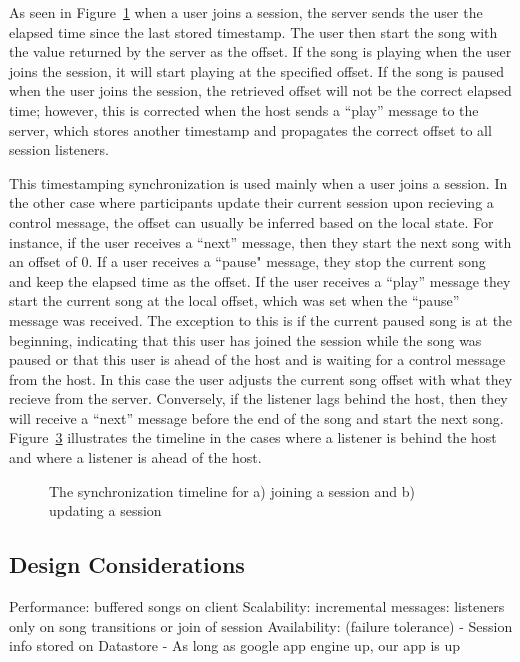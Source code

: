 As seen in Figure~\ref{fig:syncJoin} when a user joins a session, 
the server sends the user the elapsed time since the last stored timestamp. 
The user then start the song with the value returned by the server as 
the offset. If the song is playing when the user joins the session, 
it will start playing at the specified offset. If the song is paused when 
the user joins the session, the retrieved offset will not be the correct 
elapsed time; however, this is corrected when the host sends a ``play'' 
message to the server, which stores another timestamp and propagates
the correct offset to all session listeners.

This timestamping synchronization is used mainly when a user joins a session.
In the other case where participants update their current session upon 
recieving a control message, the offset can usually be inferred based on the local state. 
For instance, if the user receives a ``next'' message, then they
start the next song with an offset of 0. If a user receives a ``pause" 
message, they stop the current song and keep the elapsed time as the offset.
If the user receives a ``play'' message they start the current song at the 
local offset, which was set when the ``pause'' message was received. The exception to this 
is if the current paused song is at the beginning, indicating
that this user has joined the session while the song was paused or that this user is
ahead of the host and is waiting for a control message from the host. 
In this case the user adjusts the current song offset with what 
they recieve from the server. Conversely, if the listener lags behind the host, then they will
receive a ``next'' message before the end of the song and start the next song. Figure~\ref{fig:syncUsers}
illustrates the timeline in the cases where a listener is behind the host and where a listener
is ahead of the host.

\begin{figure}[h]
	\centering
	\begin{subfigure}
		\centering
		\label{fig:syncJoin}
	\end{subfigure}
	
	\begin{subfigure}
		\centering
		\label{fig:syncUsers}
	\end{subfigure}
	\caption{The synchronization timeline for a) joining a session and b) updating a session}
\end{figure}


\subsection{Design Considerations}
	Performance:
		buffered songs on client
	Scalability:
		incremental messages: 
			listeners
			only on song transitions or join of session
	Availability: (failure tolerance)
		- Session info stored on Datastore
		- As long as google app engine up, our app is up